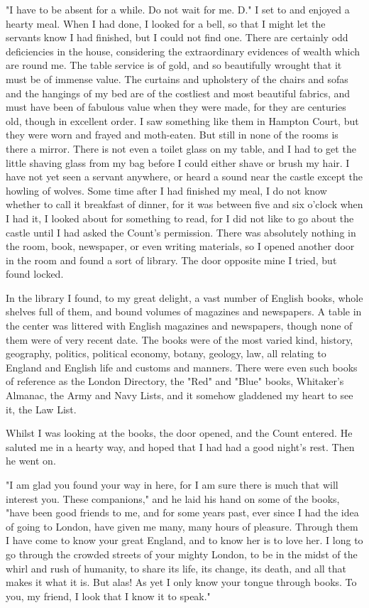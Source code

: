 "I have to be absent for a while. Do not wait for me. D." I set to and enjoyed a hearty meal. When I had done, I looked for a bell, so that I might let the servants know I had finished, but I could not find one. There are certainly odd deficiencies in the house, considering the extraordinary evidences of wealth which are round me. The table service is of gold, and so beautifully wrought that it must be of immense value. The curtains and upholstery of the chairs and sofas and the hangings of my bed are of the costliest and most beautiful fabrics, and must have been of fabulous value when they were made, for they are centuries old, though in excellent order. I saw something like them in Hampton Court, but they were worn and frayed and moth-eaten. But still in none of the rooms is there a mirror. There is not even a toilet glass on my table, and I had to get the little shaving glass from my bag before I could either shave or brush my hair. I have not yet seen a servant anywhere, or heard a sound near the castle except the howling of wolves. Some time after I had finished my meal, I do not know whether to call it breakfast of dinner, for it was between five and six o'clock when I had it, I looked about for something to read, for I did not like to go about the castle until I had asked the Count's permission. There was absolutely nothing in the room, book, newspaper, or even writing materials, so I opened another door in the room and found a sort of library. The door opposite mine I tried, but found locked. 

In the library I found, to my great delight, a vast number of English books, whole shelves full of them, and bound volumes of magazines and newspapers. A table in the center was littered with English magazines and newspapers, though none of them were of very recent date. The books were of the most varied kind, history, geography, politics, political economy, botany, geology, law, all relating to England and English life and customs and manners. There were even such books of reference as the London Directory, the "Red" and "Blue" books, Whitaker's Almanac, the Army and Navy Lists, and it somehow gladdened my heart to see it, the Law List. 

Whilst I was looking at the books, the door opened, and the Count entered. He saluted me in a hearty way, and hoped that I had had a good night's rest. Then he went on. 

"I am glad you found your way in here, for I am sure there is much that will interest you. These companions," and he laid his hand on some of the books, "have been good friends to me, and for some years past, ever since I had the idea of going to London, have given me many, many hours of pleasure. Through them I have come to know your great England, and to know her is to love her. I long to go through the crowded streets of your mighty London, to be in the midst of the whirl and rush of humanity, to share its life, its change, its death, and all that makes it what it is. But alas! As yet I only know your tongue through books. To you, my friend, I look that I know it to speak." 

